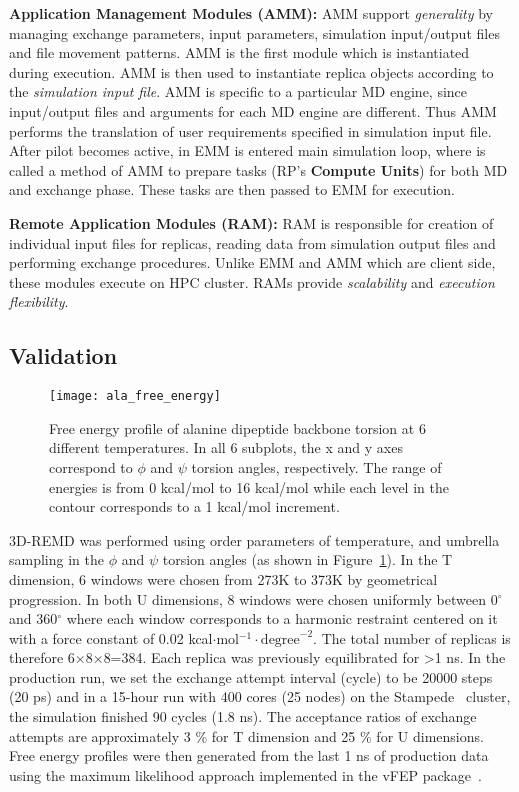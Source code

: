 \documentclass{sig-alternate-05-2015}
\begin{document}
{\bf Application Management Modules (AMM):} AMM support {\it generality} by managing exchange parameters, input parameters, simulation input/output files and file movement patterns. AMM is the first module which is instantiated during execution. AMM is then used to instantiate replica objects according to the {\it simulation input file}. AMM is specific to a particular MD engine, since input/output files and arguments for each MD engine are different. Thus AMM performs the translation of user requirements specified in simulation input file.  After pilot becomes active, in EMM is entered main simulation loop, where is called a method of AMM to prepare tasks (RP's \textbf{Compute Units}) for both MD and exchange phase. These tasks are then passed to EMM for execution.
    
{\bf Remote Application Modules (RAM):} RAM is responsible for creation of individual input files for replicas, reading data from simulation output files and performing exchange procedures. Unlike EMM and AMM which are client side, these modules execute on HPC cluster.  RAMs provide {\it scalability} and {\it execution flexibility}.

\subsection{Validation} \label{validation}

\begin{figure}
   \centering
   \texttt{[image: ala\_free\_energy]}
   \caption{\small{Free energy profile of alanine dipeptide backbone torsion at 6 different temperatures. In all 6 subplots, the x and y axes correspond to $\phi$ and $\psi$ torsion angles, respectively. The range of energies is from 0 kcal/mol to 16 kcal/mol while each level in the contour corresponds to a 1 kcal/mol increment.}}{\label{fig:energy_maps}}
\end{figure}

3D-REMD was performed using order parameters of temperature, and umbrella sampling in the $\phi$ and $\psi$ torsion angles (as shown in Figure~\ref{fig:energy_maps}). In the T dimension, 6 windows were chosen from 273K to 373K by geometrical progression. In both U dimensions, 8 windows were chosen uniformly between 0$^{\circ}$ and 360$^{\circ}$ where each window corresponds to a harmonic restraint centered on it with a force constant of 0.02 kcal${\cdot}$mol$^{-1}{\cdot}{\textrm{degree}}^{-2}$. The total number of replicas is therefore 6$\times$8$\times$8=384. Each replica was previously equilibrated for >1 ns. In the production run, we set the exchange attempt interval (cycle) to be 20000 steps (20 ps) and in a 15-hour run with 400 cores (25 nodes) on the Stampede~\cite{xsede} cluster, the simulation finished 90 cycles (1.8 ns). The acceptance ratios of exchange attempts are approximately 3 \% for T dimension and 25 \% for U dimensions. Free energy profiles were then generated from the last 1 ns of production data using the maximum likelihood approach implemented in the vFEP package~\cite{Lee_JChemTheoryComput_2013_v9_p153,Lee_JChemTheoryComput_2014_v10_p24}.
\end{document}
